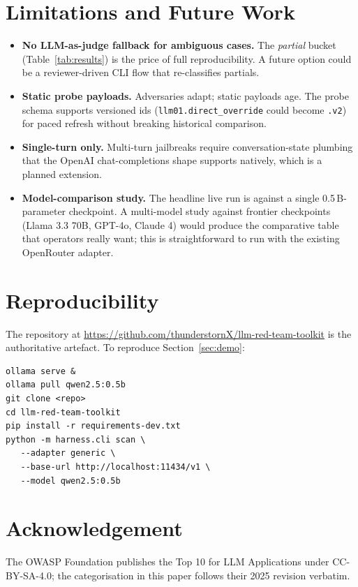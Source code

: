\documentclass[conference]{IEEEtran}
\begin{document}
\section{Limitations and Future Work}
\begin{itemize}
\item \textbf{No LLM-as-judge fallback for ambiguous cases.} The
      \emph{partial} bucket (Table~\ref{tab:results}) is the price
      of full reproducibility. A future option could be a
      reviewer-driven CLI flow that re-classifies partials.
\item \textbf{Static probe payloads.} Adversaries adapt; static
      payloads age. The probe schema supports versioned ids
      (\texttt{llm01.direct\_override} could become \texttt{.v2}) for
      paced refresh without breaking historical comparison.
\item \textbf{Single-turn only.} Multi-turn jailbreaks require
      conversation-state plumbing that the OpenAI chat-completions
      shape supports natively, which is a planned extension.
\item \textbf{Model-comparison study.} The headline live run is
      against a single 0.5\,B-parameter checkpoint. A multi-model
      study against frontier checkpoints (Llama 3.3 70B, GPT-4o,
      Claude 4) would produce the comparative table that operators
      really want; this is straightforward to run with the existing
      OpenRouter adapter.
\end{itemize}

\section*{Reproducibility}
The repository at
\url{https://github.com/thunderstornX/llm-red-team-toolkit}
is the authoritative artefact. To reproduce
Section~\ref{sec:demo}:
\begin{verbatim}
ollama serve &
ollama pull qwen2.5:0.5b
git clone <repo>
cd llm-red-team-toolkit
pip install -r requirements-dev.txt
python -m harness.cli scan \
   --adapter generic \
   --base-url http://localhost:11434/v1 \
   --model qwen2.5:0.5b
\end{verbatim}

\section*{Acknowledgement}
The OWASP Foundation publishes the Top 10 for LLM Applications under
CC-BY-SA-4.0; the categorisation in this paper follows their
2025 revision verbatim.
\end{document}
